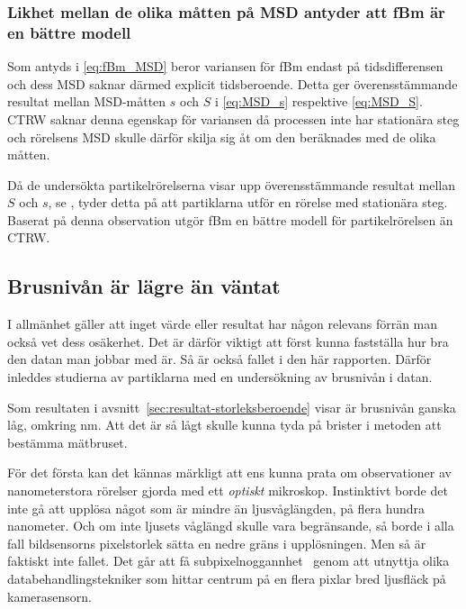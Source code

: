 \subsubsection{Likhet mellan de olika måtten på MSD antyder att fBm är en bättre modell}

Som antyds i \eqref{eq:fBm_MSD} beror variansen för fBm endast på tidsdifferensen och dess MSD saknar därmed explicit tidsberoende. Detta ger överensstämmande resultat mellan MSD-måtten $s$ och $S$ i \eqref{eq:MSD_s} respektive \eqref{eq:MSD_S}. 
CTRW saknar denna egenskap för variansen då processen inte har stationära steg och rörelsens MSD skulle därför skilja sig åt om den beräknades med de olika måtten.

Då de undersökta partikelrörelserna visar upp överensstämmande resultat mellan $S$ och $s$, se , tyder detta på att partiklarna utför en rörelse med stationära steg. Baserat på denna observation utgör fBm en bättre modell för partikelrörelsen än CTRW.



\subsection{Brusnivån är lägre än väntat}
I allmänhet gäller att inget värde eller resultat har någon relevans förrän man också vet dess osäkerhet. Det är därför viktigt att först kunna fastställa hur bra den datan man jobbar med är. Så är också fallet i den här rapporten. Därför inleddes studierna av partiklarna med en undersökning av brusnivån i datan. 

Som resultaten i avsnitt~\ref{sec:resultat-storleksberoende} visar är brusnivån ganska låg, omkring \unit[5]{nm}. Att det är så lågt skulle kunna tyda på brister i metoden att bestämma mätbruset. %

För det första kan det kännas märkligt att ens kunna prata om observationer av nanometerstora rörelser gjorda med ett \emph{optiskt} mikroskop. Instinktivt borde det inte gå att upplösa något som är mindre än ljusvåglängden, på flera hundra nanometer. Och om inte ljusets våglängd skulle vara begränsande, så borde i alla fall bildsensorns pixelstorlek sätta en nedre gräns i upplösningen. Men så är faktiskt inte fallet. Det går att få subpixelnoggannhet~\cite{Saunter2010} genom att utnyttja olika databehandlingstekniker som hittar centrum på en flera pixlar bred ljusfläck på kamerasensorn.

